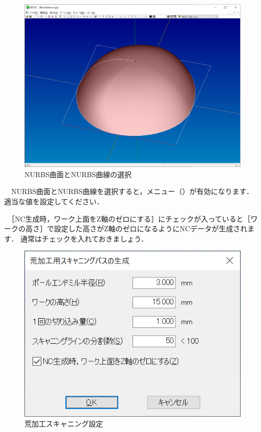 \begin{figure}[H]
\centering
\includegraphics[scale=0.5]{No2/fig/fig22.png}
\caption{NURBS曲面とNURBS曲線の選択}
\label{fig:ncvc22}
\end{figure}

　NURBS曲面とNURBS曲線を選択すると，メニュー（）が有効になります．
適当な値を設定してください．

　［NC生成時，ワーク上面をZ軸のゼロにする］にチェックが入っていると［ワークの高さ］で設定した高さがZ軸のゼロになるようにNCデータが生成されます．
通常はチェックを入れておきましょう．

\begin{figure}[H]
\centering
\includegraphics{No2/fig/fig23.png}
\caption{荒加工スキャニング設定}
\label{fig:ncvc23}
\end{figure}

